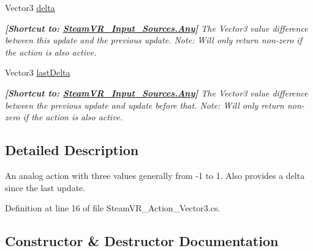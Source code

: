 \begin{DoxyCompactItemize}
Vector3 \mbox{\hyperlink{class_valve_1_1_v_r_1_1_steam_v_r___action___vector3_ac9b63c985650849f1c2ac32212ddef3e}{delta}}
\begin{DoxyCompactList}\small\item\em {\bfseries{\mbox{[}Shortcut to\+: \mbox{\hyperlink{namespace_valve_1_1_v_r_a82e5bf501cc3aa155444ee3f0662853faed36a1ef76a59ee3f15180e0441188ad}{Steam\+V\+R\+\_\+\+Input\+\_\+\+Sources.\+Any}}\mbox{]}}} The Vector3 value difference between this update and the previous update. Note\+: Will only return non-\/zero if the action is also active. \end{DoxyCompactList}\item 
Vector3 \mbox{\hyperlink{class_valve_1_1_v_r_1_1_steam_v_r___action___vector3_a3cd18f9f22012f93b408132d661340d0}{last\+Delta}}
\begin{DoxyCompactList}\small\item\em {\bfseries{\mbox{[}Shortcut to\+: \mbox{\hyperlink{namespace_valve_1_1_v_r_a82e5bf501cc3aa155444ee3f0662853faed36a1ef76a59ee3f15180e0441188ad}{Steam\+V\+R\+\_\+\+Input\+\_\+\+Sources.\+Any}}\mbox{]}}} The Vector3 value difference between the previous update and update before that. Note\+: Will only return non-\/zero if the action is also active. \end{DoxyCompactList}\end{DoxyCompactItemize}


\subsection{Detailed Description}
An analog action with three values generally from -\/1 to 1. Also provides a delta since the last update. 



Definition at line 16 of file Steam\+V\+R\+\_\+\+Action\+\_\+\+Vector3.\+cs.



\subsection{Constructor \& Destructor Documentation}
\mbox{\label{class_valve_1_1_v_r_1_1_steam_v_r___action___vector3_ad1151513dd5f37e8d04c7db2ee98590c}} 
